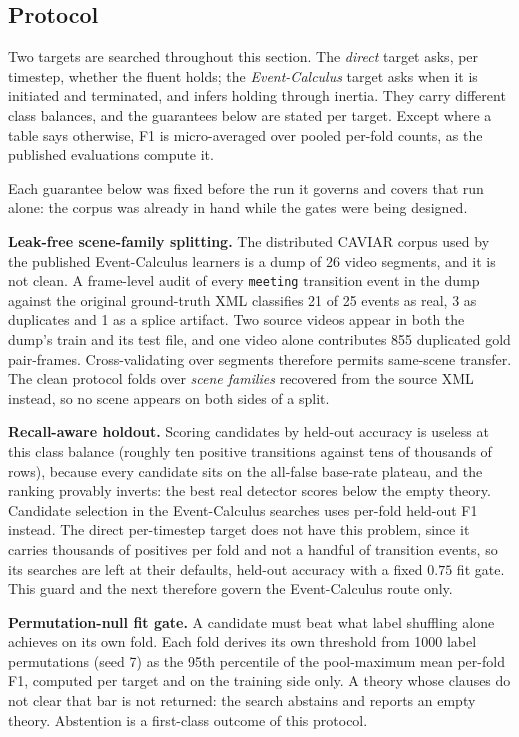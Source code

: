 \subsection{Protocol}

Two targets are searched throughout this section. The \emph{direct} target asks, per timestep, whether the fluent holds; the \emph{Event-Calculus} target asks when it is initiated and terminated, and infers holding through inertia. They carry different class balances, and the guarantees below are stated per target. Except where a table says otherwise, F1 is micro-averaged over pooled per-fold counts, as the published evaluations compute it.

Each guarantee below was fixed before the run it governs and covers that run alone: the corpus was already in hand while the gates were being designed.

\textbf{Leak-free scene-family splitting.} The distributed CAVIAR corpus used by the published Event-Calculus learners is a dump of 26 video segments, and it is not clean. A frame-level audit of every \texttt{meeting} transition event in the dump against the original ground-truth XML classifies 21 of 25 events as real, 3 as duplicates and 1 as a splice artifact. Two source videos appear in both the dump's train and its test file, and one video alone contributes 855 duplicated gold pair-frames. Cross-validating over segments therefore permits same-scene transfer. The clean protocol folds over \emph{scene families} recovered from the source XML instead, so no scene appears on both sides of a split.

\textbf{Recall-aware holdout.} Scoring candidates by held-out accuracy is useless at this class balance (roughly ten positive transitions against tens of thousands of rows), because every candidate sits on the all-false base-rate plateau, and the ranking provably inverts: the best real detector scores below the empty theory. Candidate selection in the Event-Calculus searches uses per-fold held-out F1 instead. The direct per-timestep target does not have this problem, since it carries thousands of positives per fold and not a handful of transition events, so its searches are left at their defaults, held-out accuracy with a fixed $0.75$ fit gate. This guard and the next therefore govern the Event-Calculus route only.

\textbf{Permutation-null fit gate.} A candidate must beat what label shuffling alone achieves on its own fold. Each fold derives its own threshold from 1000 label permutations (seed 7) as the 95th percentile of the pool-maximum mean per-fold F1, computed per target and on the training side only. A theory whose clauses do not clear that bar is not returned: the search abstains and reports an empty theory. Abstention is a first-class outcome of this protocol.

